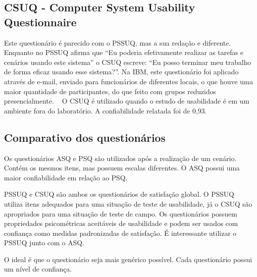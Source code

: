 \subsection{CSUQ - Computer System Usability Questionnaire}

	Este questionário é parecido com o PSSUQ, mas a sua redação e diferente. Enquanto no PSSUQ afirma que “Eu poderia efetivamente realizar as tarefas e cenários usando este sistema” o CSUQ escreve: “Eu posso terminar meu trabalho de forma eficaz usando esse sistema?”. Na IBM, este questionário foi aplicado através de e-mail, enviado para funcionários de diferentes locais, o que houve uma maior quantidade de participantes, do que feito com grupos reduzidos presencialmente. ~\cite{lewis1995ibm} 
	O CSUQ é utilizado quando o estudo de usabilidade é em um ambiente fora do laboratório. A confiabilidade relatada foi de 0,93.



\subsection{Comparativo dos questionários}

	Os questionários ASQ e PSQ são utilizados após a realização de um cenário. Contém os mesmos itens, mas possuem escalas diferentes. O ASQ possui uma maior confiabilidade em relação ao PSQ. 

	PSSUQ e CSUQ são ambos os questionários de satisfação global. O PSSUQ utiliza itens adequados para uma situação de teste de usabilidade, já o CSUQ são apropriados para uma situação de teste de campo. Os questionários possuem propriedades psicométricas aceitáveis de usabilidade e podem ser usados com confiança como medidas padronizadas de satisfação. É interessante utilizar o PSSUQ junto com o ASQ.

	O ideal é que o questionário seja mais genérico possível. Cada questionário possui um nível de confiança.

